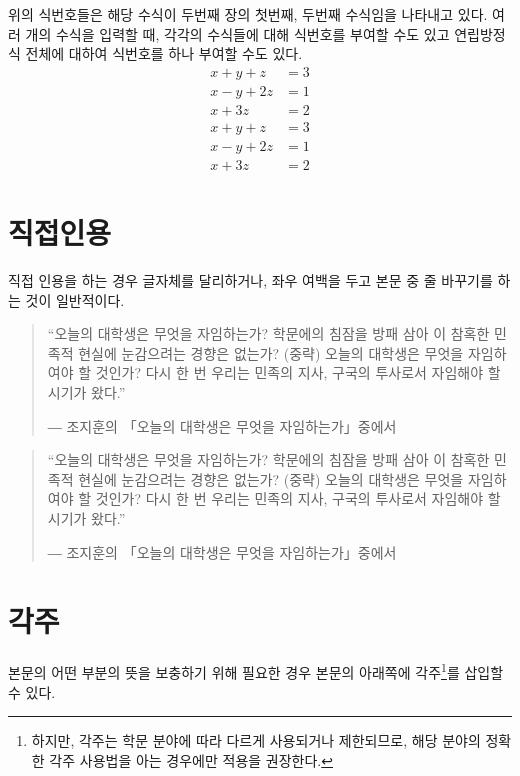 \documentclass[11pt]{report}
\begin{document}
위의 식번호들은 해당 수식이 두번째 장의 첫번째, 두번째 수식임을 나타내고 있다. 여러 개의 수식을 입력할 때, 각각의 수식들에 대해 식번호를 부여할 수도 있고 연립방정식 전체에 대하여 식번호를 하나 부여할 수도 있다.
\begin{align}
x+y+z&=3\\
x-y+2z&=1\\
x+3z&=2
\end{align}
\begin{equation}
\begin{aligned}
x+y+z&=3\\
x-y+2z&=1\\
x+3z&=2
\end{aligned}
\end{equation}

\section{직접인용}\label{sec:quotation}
직접 인용을 하는 경우 글자체를 달리하거나, 좌우 여백을 두고 본문 중 줄 바꾸기를 하는 것이 일반적이다.\par
\bigskip

\begin{quote}
“오늘의 대학생은 무엇을 자임하는가? 학문에의 침잠을 방패 삼아 이 참혹한 민족적 현실에 눈감으려는 경향은 없는가? (중략) 오늘의 대학생은 무엇을 자임하여야 할 것인가? 다시 한 번 우리는 민족의 지사, 구국의 투사로서 자임해야 할 시기가 왔다.” \par
― 조지훈의  「오늘의 대학생은 무엇을 자임하는가」중에서 
\end{quote}
\bigskip

\begin{quotation}
“오늘의 대학생은 무엇을 자임하는가? 학문에의 침잠을 방패 삼아 이 참혹한 민족적 현실에 눈감으려는 경향은 없는가? (중략) 오늘의 대학생은 무엇을 자임하여야 할 것인가? 다시 한 번 우리는 민족의 지사, 구국의 투사로서 자임해야 할 시기가 왔다.” \par
― 조지훈의  「오늘의 대학생은 무엇을 자임하는가」중에서 
\end{quotation}

\newpage

\section{각주}\label{sec:footnotes}

본문의 어떤 부분의 뜻을 보충하기 위해 필요한 경우 본문의 아래쪽에 각주\footnote{하지만, 각주는 학문 분야에 따라 다르게 사용되거나 제한되므로, 해당 분야의 정확한 각주 사용법을 아는 경우에만 적용을 권장한다.}를 삽입할 수 있다.
\end{document}
